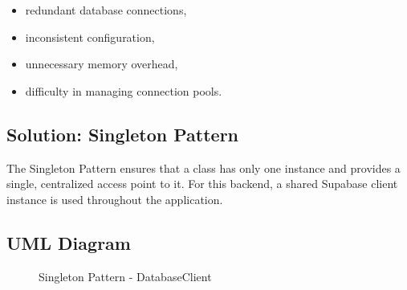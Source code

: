 \documentclass[a4paper,12pt]{report}
\begin{document}
\begin{itemize}
    \item redundant database connections,
    \item inconsistent configuration,
    \item unnecessary memory overhead,
    \item difficulty in managing connection pools.
\end{itemize}

\subsection{Solution: Singleton Pattern}

The Singleton Pattern ensures that a class has only one instance and provides a single, centralized access point to it.  
For this backend, a shared Supabase client instance is used throughout the application.


\subsection{UML Diagram}

\begin{figure}[H]
\centering
{}
\caption{Singleton Pattern - DatabaseClient}
\end{figure}
\end{document}

